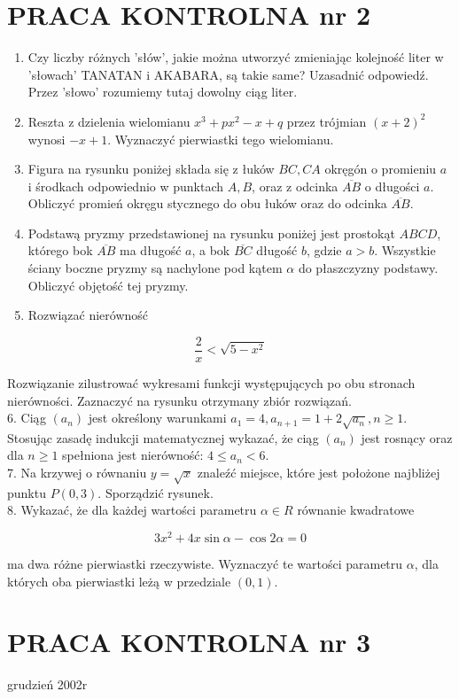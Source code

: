 \documentclass[10pt]{article}
\begin{document}
\section*{PRACA KONTROLNA nr 2}
\begin{enumerate}
  \item Czy liczby różnych 'słów', jakie można utworzyć zmieniając kolejność liter w 'słowach' TANATAN i AKABARA, są takie same? Uzasadnić odpowiedź. Przez 'słowo' rozumiemy tutaj dowolny ciąg liter.
  \item Reszta z dzielenia wielomianu $x^{3}+p x^{2}-x+q$ przez trójmian $(x+2)^{2}$ wynosi $-x+1$. Wyznaczyć pierwiastki tego wielomianu.
  \item Figura na rysunku poniżej składa się z łuków $B C, C A$ okręgón o promieniu $a$ i środkach odpowiednio w punktach $A, B$, oraz z odcinka $\overline{A B}$ o długości $a$. Obliczyć promień okręgu stycznego do obu łuków oraz do odcinka $\overline{A B}$.
  \item Podstawą pryzmy przedstawionej na rysunku poniżej jest prostokąt $A B C D$, którego bok $\overline{A B}$ ma długość $a$, a bok $\overline{B C}$ długość $b$, gdzie $a>b$. Wszystkie ściany boczne pryzmy są nachylone pod kątem $\alpha$ do płaszczyzny podstawy. Obliczyć objętość tej pryzmy.
  \item Rozwiązać nierówność
\end{enumerate}

$$
\frac{2}{x}<\sqrt{5-x^{2}}
$$

Rozwiązanie zilustrować wykresami funkcji występujących po obu stronach nierówności. Zaznaczyć na rysunku otrzymany zbiór rozwiązań.\\
6. Ciąg $\left(a_{n}\right)$ jest określony warunkami $a_{1}=4, a_{n+1}=1+2 \sqrt{a_{n}}, n \geqslant 1$. Stosując zasadę indukcji matematycznej wykazać, że ciąg $\left(a_{n}\right)$ jest rosnący oraz dla $n \geqslant 1$ spełniona jest nierówność: $4 \leqslant a_{n}<6$.\\
7. Na krzywej o równaniu $y=\sqrt{x}$ znaleźć miejsce, które jest położone najbliżej punktu $P(0,3)$. Sporządzić rysunek.\\
8. Wykazać, że dla każdej wartości parametru $\alpha \in R$ równanie kwadratowe

$$
3 x^{2}+4 x \sin \alpha-\cos 2 \alpha=0
$$

ma dwa różne pierwiastki rzeczywiste. Wyznaczyć te wartości parametru $\alpha$, dla których oba pierwiastki leżą w przedziale $(0,1)$.

\section*{PRACA KONTROLNA nr 3}
grudzień 2002r
\end{document}
